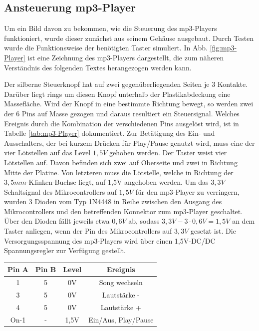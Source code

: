 \documentclass[journal, a4paper]{IEEEtran}
\begin{document}
	\subsection{Ansteuerung mp3-Player}
		\label{sc:Hardware:subsc:mp3-Player}
		Um ein Bild davon zu bekommen, wie die Steuerung des mp3-Players funktioniert, wurde dieser zunächst aus seinem Gehäuse ausgebaut. Durch Testen wurde die Funktionsweise der benötigten Taster simuliert.  In Abb. \ref{fig:mp3-Player} ist eine Zeichnung des mp3-Players dargestellt, die zum näheren Verständnis des folgenden Textes herangezogen werden kann.\par 
		Der silberne Steuerknopf hat auf zwei gegenüberliegenden Seiten je 3 Kontakte. Darüber liegt rings um diesen Knopf unterhalb der Plastikabdeckung eine Massefläche. Wird der Knopf in eine bestimmte Richtung bewegt, so werden zwei der 6 Pins auf Masse gezogen und daraus resultiert ein Steuersignal. Welches Ereignis durch die Kombination der verschiedenen Pins ausgelöst wird, ist in Tabelle \ref{tab:mp3-Player} dokumentiert. Zur Betätigung des Ein- und Ausschalters, der bei kurzem Drücken für Play/Pause genutzt wird, muss eine der vier Lötstellen auf das Level $1,5V$ gehoben werden. Der Taster weist vier Lötstellen auf. Davon befinden sich zwei auf Oberseite und zwei in Richtung Mitte der Platine. Von letzteren muss die Lötstelle, welche in Richtung der $3,5mm$-Klinken-Buchse liegt, auf 1,5V angehoben werden. Um das $3,3V$ Schaltsignal des Mikrocontrollers auf $1,5V$ für den mp3-Player zu verringern, wurden 3 Dioden vom Typ 1N4448 in Reihe zwischen den Ausgang des Mikrocontrollers und den betreffenden Konnektor zum mp3-Player geschaltet. Über den Dioden fällt jeweils etwa $0,6V$ ab, sodass $3,3V-3\cdot0,6V = 1,5V$ an dem Taster anliegen, wenn der Pin des Mikrocontrollers auf $3,3V$ gesetzt ist. Die Versorgungsspannung des mp3-Players wird über einen 1,5V-DC/DC Spannungsregler zur Verfügung gestellt.
		\begin{center}
			\begin{tabular}{cccc}
				\toprule
				Pin A & Pin B & Level & Ereignis \\
				\midrule
				1 & 5 & 0V & Song wechseln\\
				3 & 5 & 0V & Lautstärke -\\
				4 & 5 & 0V & Lautstärke +\\
				On-1 & -& 1,5V & Ein/Aus, Play/Pause\\
				\bottomrule		
			\end{tabular}
			\label{tab:mp3-Player}
		\end{center}
\end{document}

